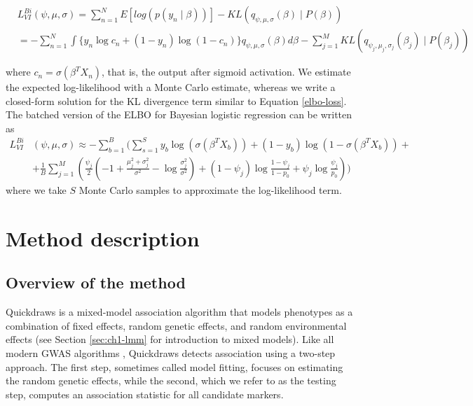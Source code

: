 \begin{small}
\begin{align}
 &L^{Bi}_{VI}(\psi, \mu, \sigma) = \sum\limits^{N}_{n=1} E[log(p(y_{n} \mid \beta))] - KL(q_{\psi, \mu, \sigma}(\beta) \mid P(\beta)) \nonumber \\
 &= - \sum\limits^{N}_{n=1} \int \{y_n \log c_n + (1-y_n)\log(1-c_n)\} q_{\psi, \mu, \sigma}(\beta) d\beta - \sum\limits^{M}_{j=1} KL(q_{\psi_j, \mu_j, \sigma_j}(\beta_j) \mid P(\beta_j))
\label{spike-and-slab-2}
\end{align}
\end{small}
where $c_n = \sigma(\beta^T X_n)$, that is, the output after sigmoid activation.
%
We estimate the expected log-likelihood with a Monte Carlo estimate, whereas we write a closed-form solution for the KL divergence term similar to Equation \ref{elbo-loss}.
%
The batched version of the ELBO for Bayesian logistic regression can be written as
\begin{align}
    L^{Bi}_{VI}&(\psi, \mu, \sigma) \approx - \sum\limits^{B}_{b=1} \Bigg( \sum\limits^{S}_{s=1} y_b \log(\sigma(\beta^T X_b)) + (1-y_b)\log(1-\sigma(\beta^T X_b)) \nonumber +\\
    &+ \frac{1}{B}\sum\limits^{M}_{j=1} \left(  \frac{\psi_j}{2}\left(-1 + \frac{\mu_j^2 + \sigma_j^2}{\sigma^2} - \log \frac{\sigma_j^2}{\sigma^2} \right) + (1-\psi_j)\log\frac{1 - \psi_j}{1 - p_0} + \psi_j\log\frac{\psi_j}{p_0} \right) \Bigg)
\label{elbo-loss2}
\end{align}
where we take $S$ Monte Carlo samples to approximate the log-likelihood term.


\section{Method description}
\label{sec:ch4-method}
\subsection{Overview of the method}
Quickdraws is a mixed-model association algorithm that models phenotypes as a combination of fixed effects, random genetic effects, and random environmental effects (see Section \ref{sec:ch1-lmm} for introduction to mixed models).
%
Like all modern GWAS algorithms \cite{loh2015efficient,loh2018mixed,zhou2018efficiently,jiang2019resource,jiang2021generalized,mbatchou2021computationally}, Quickdraws detects association using a two-step approach.
%
The first step, sometimes called model fitting, focuses on estimating the random genetic effects, while the second, which we refer to as the testing step, computes an association statistic for all candidate markers.

